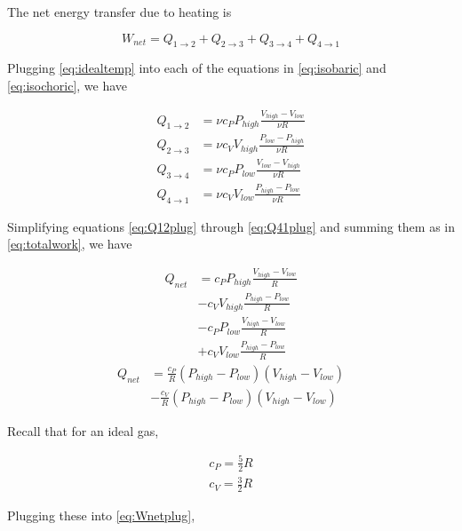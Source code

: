 \documentclass[12pt,a4paper,twocolumn]{article}
\begin{document}
The net energy transfer due to heating is

\begin{equation}\label{eq:totalwork}
	W_{net} = Q_{1 \rightarrow 2} + Q_{2 \rightarrow 3} + Q_{3 \rightarrow 4} + Q_{4 \rightarrow 1}
\end{equation}

Plugging \eqref{eq:idealtemp} into each of the equations in \eqref{eq:isobaric} and \eqref{eq:isochoric}, we have

\begin{align}
	Q_{1 \rightarrow 2} & = \nu c_P P_{high} \frac{V_{high} - V_{low}}{\nu R} \label{eq:Q12plug} \\
	Q_{2 \rightarrow 3} & = \nu c_V V_{high} \frac{P_{low} - P_{high}}{\nu R} \label{eq:Q23plug} \\
	Q_{3 \rightarrow 4} & = \nu c_P P_{low} \frac{V_{low} - V_{high}}{\nu R} \label{eq:Q34plug} \\
	Q_{4 \rightarrow 1} & = \nu c_V V_{low} \frac{P_{high} - P_{low}}{\nu R} \label{eq:Q41plug}
\end{align}

Simplifying equations \eqref{eq:Q12plug} through \eqref{eq:Q41plug} and summing them as in \eqref{eq:totalwork}, we have

\begin{align}
	Q_{net} & = c_P P_{high} \frac{V_{high} - V_{low}}{R} \nonumber \\
	& - c_V V_{high} \frac{P_{high} - P_{low}}{R} \nonumber \\
	& - c_P P_{low} \frac{V_{high} - V_{low}}{R} \nonumber \\
	& + c_V V_{low} \frac{P_{high} - P_{low}}{R}
\end{align}
\begin{align}
	Q_{net} & = \frac{c_P}{R} \left( P_{high} - P_{low} \right) \left( V_{high} - V_{low} \right) \nonumber \\
	& -\frac{c_V}{R} \left( P_{high} - P_{low} \right) \left( V_{high} - V_{low} \right) \label{eq:Wnetplug}
\end{align}

Recall that for an ideal gas,

\begin{eqnarray}
	c_P = \frac{5}{2} R \label{eq:idealcp} \\
	c_V = \frac{3}{2} R \label{eq:idealcv}
\end{eqnarray}

Plugging these into \eqref{eq:Wnetplug},
\end{document}
